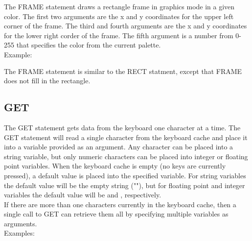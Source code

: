 The {\ttfamily FRAME} statement draws a rectangle frame in graphics mode in a
given color.  The first two arguments are the x and y coordinates for the upper
left corner of the frame.  The third and fourth arguments are the x and y
coordinates for the lower right corder of the frame.  The fifth argument is a
number from 0-255 that specifies the color from the current palette.\\

Example:\\


The {\ttfamily FRAME} statement is similar to the {\ttfamily RECT} statment,
except that {\ttfamily FRAME} does not fill in the rectangle.

\subsection{GET}

The {\ttfamily GET} statement gets data from the keyboard one character at a
time.  The {\ttfamily GET} statement will read a single character from the
keyboard cache and place it into a variable provided as an argument.  Any
character can be placed into a string variable, but only numeric characters can
be placed into integer or floating point variables.  When the keyboard cache is
empty (no keys are currently pressed), a default value is placed into the
specified variable.  For string variables the default value will be the empty
string ({\ttfamily ""}), but for floating point and integer variables the
default value will be {} and {}, respectively.\\

If there are more than one characters currently in the keyboard cache,
then a single call to {\ttfamily GET} can retrieve them all by specifying
multiple variables as arguments.\\

Examples:\\

